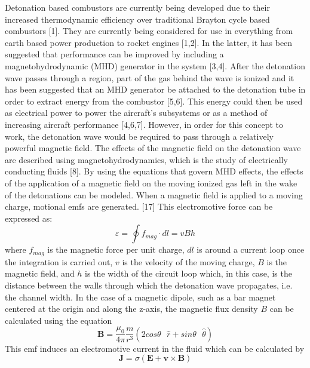 \documentclass[preview,12pt]{article}
\begin{document}
Detonation based combustors are currently being developed due to their increased thermodynamic efficiency over traditional Brayton cycle based combustors [1].  They are currently being considered for use in everything from earth based power production to rocket engines [1,2].  In the latter, it has been suggested that performance can be improved by including a magnetohydrodynamic (MHD) generator in the system [3,4].  After the detonation wave passes through a region, part of the gas behind the wave is ionized and it has been suggested that an MHD generator be attached to the detonation tube in order to extract energy from the combustor [5,6].  This energy could then be used as electrical power to power the aircraft's subsystems or as a method of increasing aircraft performance [4,6,7].  However, in order for this concept to work, the detonation wave would be required to pass through a relatively powerful magnetic field. 
\newline
\indent The effects of the magnetic field on the detonation wave are described using magnetohydrodynamics, which is the study of electrically conducting fluids [8].  By using the equations that govern MHD effects, the effects of the application of a magnetic field on the moving ionized gas left in the wake of the detonations can be modeled.  When a magnetic field is applied to a moving charge, motional emfs are generated. [17]  This electromotive force can be expressed as: 
\begin{equation}
    \varepsilon=\oint f_{mag}\cdot dl=vBh
\end{equation}
where $f_{mag}$ is the magnetic force per unit charge, $dl$ is around a current loop once the integration is carried out, $v$ is the velocity of the moving charge, $B$ is the magnetic field, and $h$ is the width of the circuit loop which, in this case, is the distance between the walls through which the detonation wave propagates, i.e. the channel width.  In the case of a magnetic dipole, such as a bar magnet centered at the origin and along the z-axis, the magnetic flux density $B$ can be calculated using the equation
\begin{equation}
    \textbf{B}=\frac{\mu_0}{4\pi}\frac{m}{r^3}(2cos\theta\textrm{ }\hat{r}+sin\theta\textrm{ }\hat{\theta})
\end{equation}
This emf induces an electromotive current in the fluid which can be calculated by
\begin{equation}
    \textbf{J}=\sigma(\textbf{E}+\textbf{v}\times \textbf{B})
\end{equation}
\end{document}
